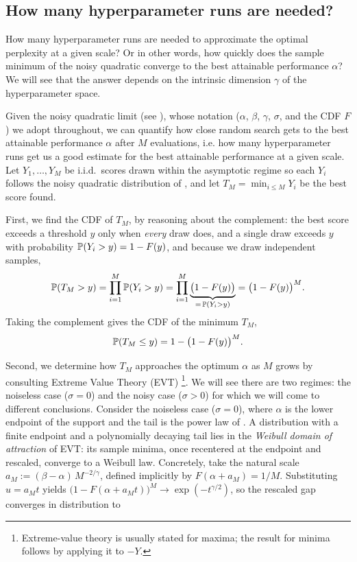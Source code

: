 \subsection{How many hyperparameter runs are needed?}
\label{app:background:how-close-does-random-search-get}

How many hyperparameter runs are needed to approximate the optimal perplexity at a given scale? Or in other words, how quickly does the sample minimum of the noisy quadratic converge to the best attainable performance $\alpha$? We will see that the answer depends on the intrinsic dimension $\gamma$ of the hyperparameter space.

Given the noisy quadratic limit (see ), whose notation ($\alpha$, $\beta$, $\gamma$, $\sigma$, and the CDF $F$) we adopt throughout, we can quantify how close random search gets to the best attainable performance $\alpha$ after $M$ evaluations, i.e. how many hyperparameter runs get us a good estimate for the best attainable performance at a given scale. Let $Y_1, \dots, Y_M$ be i.i.d.\ scores drawn within the asymptotic regime so each $Y_i$ follows the noisy quadratic distribution of , and let $T_M = \min_{i \leq M} Y_i$ be the best score found.

First, we find the CDF of $T_M$, by reasoning about the complement: the best score exceeds a threshold $y$ only when \emph{every} draw does, and a single draw exceeds $y$ with probability $\mathbb{P}(Y_i > y) = 1 - F(y)$, and because we draw independent samples,
%
\begin{equation}\label{eq:min-survival}
    \mathbb{P}(T_M > y) = \prod_{i=1}^{M} \mathbb{P}(Y_i > y) = \prod_{i=1}^{M} \underbrace{\bigl(1 - F(y)\bigr)}_{=\,\mathbb{P}(Y_i > y)} = \bigl(1 - F(y)\bigr)^M.
\end{equation}
%
Taking the complement gives the CDF of the minimum $T_M$,
%
\begin{equation}\label{eq:min-cdf}
    \mathbb{P}(T_M \leq y) = 1 - \bigl(1 - F(y)\bigr)^M.
\end{equation}


Second, we determine how $T_M$ approaches the optimum $\alpha$ as $M$ grows by consulting Extreme Value Theory (EVT)\citep{gnedenko1943distribution, de2006extreme}
\footnote{
    Extreme-value theory is usually stated for maxima; the result for minima follows by applying it to $-Y$.
}.
We will see there are two regimes: the noiseless case ($\sigma = 0$) and the noisy case ($\sigma > 0$) for which we will come to different conclusions.
Consider the noiseless case ($\sigma = 0$), where $\alpha$ is the lower endpoint of the support and the tail is the power law of . A distribution with a finite endpoint and a polynomially decaying tail lies in the \emph{Weibull domain of attraction} of EVT: its sample minima, once recentered at the endpoint and rescaled, converge to a Weibull law. Concretely, take the natural scale $a_M := (\beta - \alpha)\, M^{-2/\gamma}$, defined implicitly by $F(\alpha + a_M) = 1/M$. Substituting $u = a_M t$ yields $\bigl(1 - F(\alpha + a_M t)\bigr)^M \to \exp(-t^{\gamma/2})$, so the rescaled gap converges in distribution to 

